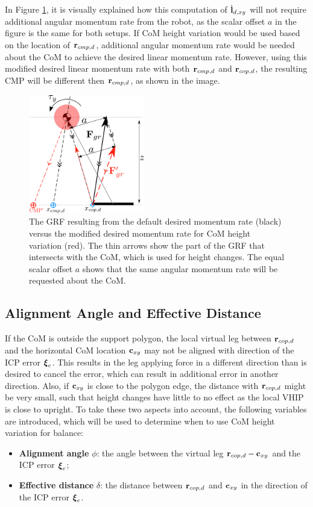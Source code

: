 In Figure \ref{fig:rcopdvsrcmpd}, it is visually explained how this computation of $\dot{\mathbf{l}}_{d,xy}$ will not require additional angular momentum rate from the robot, as the scalar offset $a$ in the figure is the same for both setups. If \ac{CoM} height variation would be used based on the location of $\mathbf{r}_{cmp,d}$, additional angular momentum rate would be needed about the \ac{CoM} to achieve the desired linear momentum rate. However, using this modified desired linear momentum rate with both $\mathbf{r}_{cmp,d}$ and $\mathbf{r}_{cop,d}$, the resulting \ac{CMP} will be different then $\mathbf{r}_{cmp,d}$, as shown in the image. 

\begin{figure}
\centering
\includegraphics[width=0.45\textwidth]{STYLESTUFF/2DControlStrategyViz.png}
\caption{The \ac{GRF} resulting from the default desired momentum rate (black) versus the modified desired momentum rate for \ac{CoM} height variation (red). The thin arrows show the part of the \ac{GRF} that intersects with the \ac{CoM}, which is used for height changes. The equal scalar offset $a$ shows that the same angular momentum rate will be requested about the \ac{CoM}.}
\label{fig:rcopdvsrcmpd}
\end{figure}
\subsection{Alignment Angle and Effective Distance}
If the \ac{CoM} is outside the support polygon, the local virtual leg between $\mathbf{r}_{cop,d}$ and the horizontal \ac{CoM} location $\mathbf{c}_{xy}$ may not be aligned with direction of the \ac{ICP} error $\boldsymbol{\xi}_e$. This results in the leg applying force in a different direction than is desired to cancel the error, which can result in additional error in another direction. Also, if $\mathbf{c}_{xy}$ is close to the polygon edge, the distance with $\mathbf{r}_{cop,d}$ might be very small, such that height changes have little to no effect as the local \ac{VHIP} is close to upright. To take these two aspects into account, the following variables are introduced, which will be used to determine when to use \ac{CoM} height variation for balance:
\begin{itemize}
	\item \textbf{Alignment angle} $\phi$: the angle between the virtual leg $\mathbf{r}_{cop,d}-\mathbf{c}_{xy}$ and the \ac{ICP} error $\boldsymbol{\xi}_e$;
	\item \textbf{Effective distance} $\delta$: the distance between $\mathbf{r}_{cop,d}$ and $\mathbf{c}_{xy}$ in the direction of the \ac{ICP} error $\boldsymbol{\xi}_e$.
\end{itemize}

